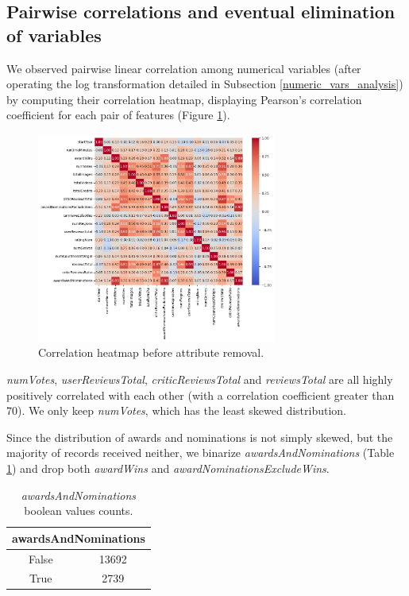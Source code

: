 \subsection{Pairwise correlations and eventual elimination of variables}
We observed pairwise linear correlation among numerical variables (after operating the log transformation detailed in Subsection \ref{numeric_vars_analysis}) by computing their correlation heatmap, displaying Pearson’s correlation coefficient for each pair of features (Figure \ref{fig:heatmap_first.png}).

\begin{figure}
    \centering
    \includegraphics[width=0.7\textwidth]{../results/images/heatmap_first.png}
    \caption{Correlation heatmap before attribute removal.}
    \label{fig:heatmap_first.png}
\end{figure}


\textit{numVotes}, \textit{userReviewsTotal}, \textit{criticReviewsTotal} and \textit{reviewsTotal} are all highly positively correlated with each other (with a correlation coefficient greater than 70). We only keep \textit{numVotes}, which has the least skewed distribution.

Since the distribution of awards and nominations is not simply skewed, but the majority of records received neither, we binarize \textit{awardsAndNominations} (Table \ref{tab:awards_nominations_bool}) and drop both \textit{awardWins} and \textit{awardNominationsExcludeWins}.

\begin{table}[h]
    \centering
    \renewcommand{\arraystretch}{1}
    \begin{tabular}{|c|c|}
        \hline
        \multicolumn{2}{|c|}{\textbf{awardsAndNominations}} \\ \hline
        False & 13692 \\ \hline
        True  & 2739 \\ \hline
    \end{tabular}
    \caption{\textit{awardsAndNominations} boolean values counts.}
    \label{tab:awards_nominations_bool}
\end{table}

